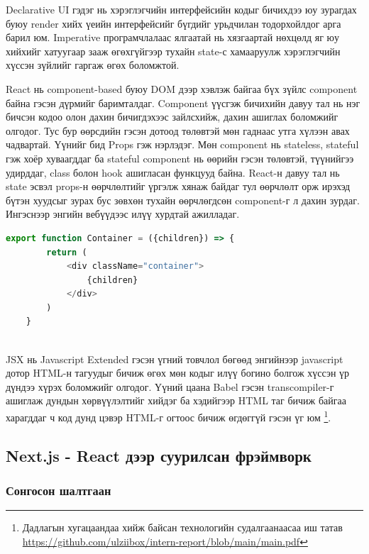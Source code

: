 Declarative UI гэдэг нь хэрэглэгчийн интерфейсийн кодыг бичихдээ юу зурагдах буюу render хийх үеийн интерфейсийг бүгдийг урьдчилан тодорхойлдог арга барил юм. Imperative програмчлалаас ялгаатай нь хязгаартай нөхцөлд яг юу хийхийг хатуугаар зааж өгөхгүйгээр тухайн state-с хамааруулж хэрэглэгчийн хүссэн зүйлийг гаргаж өгөх боломжтой.

React нь component-based буюу DOM дээр хэвлэж байгаа бүх зүйлс component байна гэсэн дүрмийг баримталдаг. Component үүсгэж бичихийн давуу тал нь нэг бичсэн кодоо олон дахин бичигдэхээс зайлсхийж, дахин ашиглах боломжийг олгодог. Тус бур өөрсдийн гэсэн дотоод төлөвтэй мөн гаднаас утга хүлээн авах чадвартай. Үүнийг бид Props гэж нэрлэдэг. Мөн component нь stateless, stateful гэж хоёр хуваагддаг ба stateful component нь өөрийн гэсэн төлөвтэй, түүнийгээ удирддаг, class болон hook ашигласан функцууд байна. React-н давуу тал нь state эсвэл props-н өөрчлөлтийг үргэлж хянаж байдаг тул өөрчлөлт орж ирэхэд бүтэн хуудсыг зурах бус зөвхөн тухайн өөрчлөгдсөн component-г л дахин зурдаг. Ингэснээр энгийн вебүүдээс илүү хурдтай ажилладаг.

\begin{lstlisting}[language=Javascript, caption=JSX ашиглаж 'container' класстай html элемент буцаах компонент, frame=single]
	export function Container = ({children}) => {
		return (
			<div className="container">
				{children}
			</div>
		)
	}
			
\end{lstlisting}

JSX нь Javascript Extended гэсэн үгний товчлол бөгөөд энгийнээр javascript дотор HTML-н тагуудыг бичиж өгөх мөн кодыг илүү богино болгож хүссэн үр дүндээ хүрэх боломжийг олгодог. Үүний цаана Babel гэсэн transcompiler-г ашиглаж дундын хөрвүүлэлтийг хийдэг ба хэдийгээр HTML таг бичиж байгаа харагддаг ч код дунд цэвэр HTML-г огтоос бичиж өгдөггүй гэсэн үг юм \footnote{Дадлагын хугацаандаа хийж байсан технологийн судалгаанаасаа иш татав \url{https://github.com/ulziibox/intern-report/blob/main/main.pdf}}.

\subsection{Next.js - React дээр суурилсан фрэймворк}

\subsubsection{Сонгосон шалтгаан}

